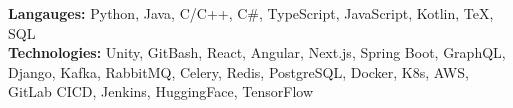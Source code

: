 \documentclass[10pt]{developercv} %
\begin{document}

\begin{minipage}[t]{\textwidth}
	\vspace{-\baselineskip}
	\textbf{Langauges:} Python, Java, C/C++, C\#, TypeScript, JavaScript, Kotlin, TeX, SQL\\
	\textbf{Technologies:} Unity, GitBash, React, Angular, Next.js, Spring Boot, GraphQL, Django, Kafka, RabbitMQ, Celery, Redis,
	PostgreSQL, Docker, K8s, AWS, GitLab CICD, Jenkins, HuggingFace, TensorFlow
\end{minipage}


\end{document}
